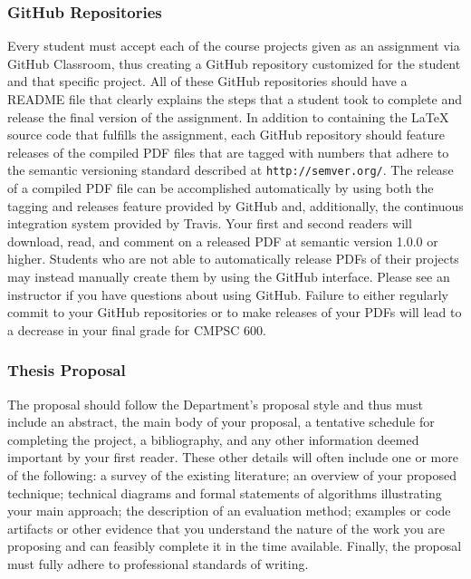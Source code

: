 \documentclass[11pt]{article}
\newcommand{\url}[1]{\lstinline{#1}}
\begin{document}

\subsubsection*{GitHub Repositories}

Every student must accept each of the course projects given as an assignment via GitHub Classroom, thus creating a GitHub repository customized for the student and that specific project. All of these GitHub repositories should have a README file that clearly explains the steps that a student took to complete and release the final version of the assignment. In addition to containing the \LaTeX{} source code that fulfills the assignment, each GitHub repository should feature releases of the compiled PDF files that are tagged with numbers that adhere to the semantic versioning standard described at \url{http://semver.org/}. The release of a compiled PDF file can be accomplished automatically by using both the tagging and releases feature provided by GitHub and, additionally, the continuous integration system provided by Travis. Your first and second readers will download, read, and comment on a released PDF at semantic version 1.0.0 or higher. Students who are not able to automatically release PDFs of their projects may instead manually create them by using the GitHub interface. Please see an instructor if you have questions about using GitHub. Failure to either regularly commit to your GitHub repositories or
to make releases of your PDFs will lead to a decrease in your final grade for CMPSC 600.

\subsubsection*{Thesis Proposal}

The proposal should follow the Department's proposal style and thus must include an abstract, the main body of your proposal, a tentative schedule for completing the project, a bibliography, and any other information deemed important by your first reader. These other details will often include one or more of the following: a survey of the existing literature; an overview of your proposed technique; technical diagrams and formal statements of algorithms illustrating your main approach; the description of an evaluation method; examples or code artifacts or other evidence that you understand the nature of the work you are proposing and can feasibly complete it in the time available.  Finally, the proposal must fully adhere to professional standards of writing.
\end{document}
